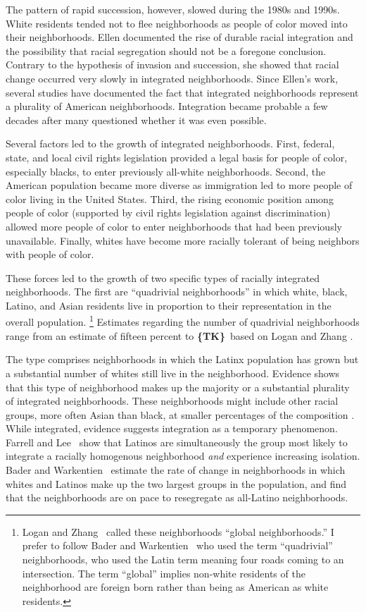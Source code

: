 \documentclass[11pt]{baderart}
\newcommand{\TK}{\textbf{\{TK\}}}
\begin{document}
The pattern of rapid succession, however, slowed during the 1980s and 1990s. White residents tended not to flee neighborhoods as people of color moved into their neighborhoods. Ellen \needcite documented the rise of durable racial integration and the possibility that racial segregation should not be a foregone conclusion. Contrary to the hypothesis of invasion and succession, she showed that racial change occurred very slowly in integrated neighborhoods. Since Ellen's work, several studies have documented the fact that integrated neighborhoods represent a plurality of American neighborhoods. Integration became probable a few decades after many questioned whether it was even possible. 

Several factors led to the growth of integrated neighborhoods. First, federal, state, and local civil rights legislation provided a legal basis for people of color, especially blacks, to enter previously all-white neighborhoods. Second, the American population became more diverse as immigration led to more people of color living in the United States. Third, the rising economic position among people of color (supported by civil rights legislation against discrimination) allowed more people of color to enter neighborhoods that had been previously unavailable. Finally, whites have become more racially tolerant of being neighbors with people of color. 

These forces led to the growth of two specific types of racially integrated neighborhoods. The first are ``quadrivial neighborhoods'' in which white, black, Latino, and Asian residents live in proportion to their representation in the overall population.
\footnote{Logan and Zhang \needcite\ called these neighborhoods ``global neighborhoods.'' I prefer to follow Bader and Warkentien \needcite\ who used the term ``quadrivial'' neighborhoods, who used the Latin term meaning four roads coming to an intersection. The term ``global'' implies non-white residents of the neighborhood are foreign born rather than being as American as white residents.}
Estimates regarding the number of quadrivial neighborhoods range from an estimate of fifteen percent to \TK\ based on Logan and Zhang \needcite. 

The type comprises neighborhoods in which the Latinx population has grown but a substantial number of whites still live in the neighborhood. Evidence shows that this type of neighborhood makes up the majority or a substantial plurality of integrated neighborhoods. These neighborhoods might include other racial groups, more often Asian than black, at smaller percentages of the composition \needcite. While integrated, evidence suggests integration as a temporary phenomenon. Farrell and Lee \needcite\ show that Latinos are simultaneously the group most likely to integrate a racially homogenous neighborhood \emph{and} experience increasing isolation. Bader and Warkentien \needcite\ estimate the rate of change in neighborhoods in which whites and Latinos make up the two largest groups in the population, and find that the neighborhoods are on pace to resegregate as all-Latino neighborhoods.
\end{document}
